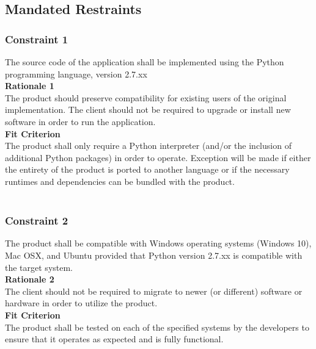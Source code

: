\documentclass[12pt, titlepage]{article}
\newcommand {\PYVER}{2.7.xx }
\begin{document}
	\subsection{Mandated Restraints}
		\subsubsection*{Constraint 1}  \label {constraint1}
		\indent The source code of the application shall be implemented 
		using the Python programming language, version \PYVER\\
		\textbf{Rationale 1}\\
		\indent The product should preserve compatibility for existing users of 
		the original implementation. The client should not be required to 
		upgrade or install new software in order to run the application.\\
		\textbf{Fit Criterion}\\
		\indent The product shall only require a Python interpreter 
		(and/or the inclusion of additional Python packages) in order to 
		operate. Exception will be made if either the entirety of the product 
		is ported to another language or if the necessary runtimes and 
		dependencies can be bundled with the product.\\\\
		
		\subsubsection*{Constraint 2} \label {constraint2}
		\indent The product shall be compatible with Windows operating systems 
		(Windows 10), Mac OSX, and Ubuntu provided that Python version \PYVER
		is compatible with the target system.\\
		\textbf{Rationale 2}\\
		\indent The client should not be required to migrate to newer (or 
		different) software or hardware in order to utilize the product.\\
		\textbf{Fit Criterion}\\
		\indent The product shall be tested on each of the specified systems by 
		the developers to ensure that it operates as expected and is fully 
		functional.\\\\
		
\end{document}
